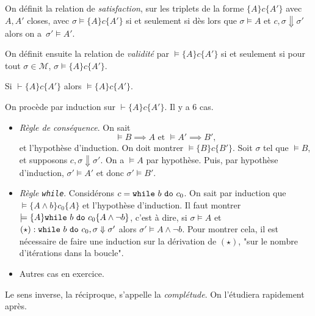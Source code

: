\documentclass[../main]{subfiles}
\begin{document}
  \begin{defn}
    On définit la relation de \textit{satisfaction}, sur les triplets de la forme $\{A\} c \{A'\}$ avec $A,A'$ closes, avec
    $\sigma \models \{A\}c \{A'\}$ si et seulement si dès lors que $\sigma \models A$ et $c, \sigma \Downarrow \sigma'$ alors on a~$\sigma' \models A'$. 

    On définit ensuite la relation de \textit{validité} par $\models \{A\} c \{A'\}$ si et seulement si pour tout $\sigma \in \mathcal{M}$, $\sigma \models \{A\}c \{A'\}$.
  \end{defn}

  \begin{thm}
    Si $\vdash \{A\} c \{A'\}$ alors $\models \{A\} c \{A'\}$.
  \end{thm}
  \begin{prv}
    On procède par induction sur $\vdash \{A\} c \{A'\}$. Il y a 6 cas.
    \begin{itemize}
      \item \textsl{Règle de conséquence}.
        On sait \[
        \models B \implies A \text{ et }\models A' \implies B'
        ,\]et l'hypothèse d'induction.
        On doit montrer $\models \{B\}c \{B'\}$.
        Soit $\sigma$ tel que $\models B$, et supposons $c, \sigma \Downarrow \sigma'$.
        On a $\models A$ par hypothèse.
        Puis, par hypothèse d'induction, $\sigma' \models A'$ et donc $\sigma' \models B'$.
      \item \textsl{Règle \texttt{while}}.
        Considérons $c = \texttt{while}\ b\ \texttt{do}\ c_0$.
        On sait par induction que $\models \{A \land b\}c_0 \{A\}$ et l'hypothèse d'induction.
        Il faut montrer $\models \{A\} \texttt{while}\ b\ \texttt{do}\ c_0 \{A \land \lnot b\}$, c'est à dire, si $\sigma \models A$ et $(\star) : \texttt{while}\ b\ \texttt{do}\ c_0, \sigma \Downarrow \sigma'$ alors $\sigma' \models A \land \lnot b$.
        Pour montrer cela, il est nécessaire de faire une induction sur la dérivation de $(\star)$, "sur le nombre d'itérations dans la boucle".
      \item Autres cas en exercice.
    \end{itemize}
  \end{prv}


  Le sens inverse, la réciproque, s'appelle la \textit{complétude}.
  On l'étudiera rapidement après.
\end{document}
